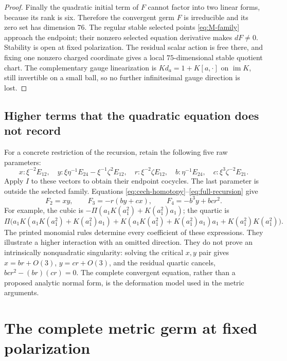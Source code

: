 \documentclass[11pt]{amsart}
\theoremstyle{definition}
\theoremstyle{remark}
\newcommand{\im}{\operatorname{im}}
\begin{document}
\begin{proof}
Finally the quadratic initial term of $F$ cannot factor into two
linear forms, because its rank is six. Therefore the convergent germ
$F$ is irreducible and its zero set has dimension $76$.
The regular stable selected points \eqref{eq:M-family} approach the
endpoint; their nonzero selected equation derivative makes $dF\ne0$.
Stability is open at fixed polarization. The residual scalar action is
free there, and fixing one nonzero charged coordinate gives a local
$75$-dimensional stable quotient chart. The complementary gauge
linearization is $Kd_a=1+K[a,\cdot]$ on $\im K$, still invertible
on a small ball, so no further infinitesimal gauge direction is lost.
\end{proof}

\subsection{Higher terms that the quadratic equation does not record}
For a concrete restriction of the recursion, retain the following five
raw parameters:
\[
 x:\xi^{-2}E_{12},\quad
 y:\xi\eta^{-1}E_{24}-\xi^{-1}\zeta^2E_{12},\quad
 r:\xi^{-2}\zeta E_{12},\quad
 b:\eta^{-1}E_{24},\quad c:\xi^3\zeta^{-2}E_{21}.
\]
Apply $I$ to these vectors to obtain their endpoint cocycles. The last
parameter is outside the selected family. Equations
\eqref{eq:cech-homotopy}--\eqref{eq:full-recursion} give
\begin{equation}\label{eq:higher-terms}
 F_2=xy,\qquad F_3=-r(by+cx),\qquad
 F_4=-b^3y+bcr^2.
\end{equation}
For example, the cubic is
$-\Pi(a_1K(a_1^2)+K(a_1^2)a_1)$; the quartic is
\[
 \Pi\bigl(a_1K(a_1K(a_1^2)+K(a_1^2)a_1)
 +K(a_1K(a_1^2)+K(a_1^2)a_1)a_1+K(a_1^2)K(a_1^2)\bigr).
\]
The printed monomial rules determine every coefficient of these expressions.
They illustrate a higher interaction with an omitted direction.
They do not prove an intrinsically nonquadratic singularity: solving the
critical $x,y$ pair gives $x=br+O(3)$, $y=cr+O(3)$, and the residual
quartic cancels, $bcr^2-(br)(cr)=0$. The complete convergent equation,
rather than a proposed analytic normal form, is the deformation model
used in the metric arguments.

\section{The complete metric germ at fixed polarization}\label{sec:endpoint-metric}
\end{document}
